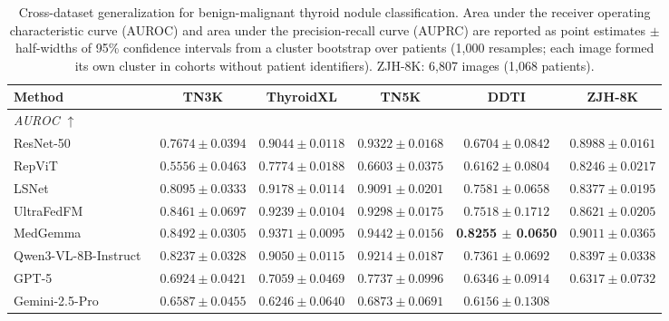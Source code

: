 \begin{table}[p]
\centering
\begin{threeparttable}

\caption{Cross-dataset generalization for benign-malignant thyroid nodule classification. Area under the receiver operating characteristic curve (AUROC) and area under the precision-recall curve (AUPRC) are reported as point estimates $\pm$ half-widths of 95\% confidence intervals from a cluster bootstrap over patients (1{,}000 resamples; each image formed its own cluster in cohorts without patient identifiers). ZJH-8K: 6{,}807 images (1{,}068 patients).}
\label{tab:cls_performance}

\footnotesize
\setlength{\tabcolsep}{5.5pt}
\renewcommand{\arraystretch}{1.08}

\begin{tabular}{lccccc}
\toprule
\textbf{Method}
& \textbf{TN3K}
& \textbf{ThyroidXL}
& \textbf{TN5K}
& \textbf{DDTI}
& \textbf{ZJH-8K} \\
\midrule
\multicolumn{6}{l}{\textit{AUROC $\uparrow$}} \\
\midrule
ResNet-50~\cite{he2016deep}
& $0.7674 \pm 0.0394$
& $0.9044 \pm 0.0118$
& $0.9322 \pm 0.0168$
& $0.6704 \pm 0.0842$
& $0.8988 \pm 0.0161$ \\
RepViT~\cite{wang2023repvit}
& $0.5556 \pm 0.0463$
& $0.7774 \pm 0.0188$
& $0.6603 \pm 0.0375$
& $0.6162 \pm 0.0804$
& $0.8246 \pm 0.0217$ \\
LSNet~\cite{wang2025lsnet}
& $0.8095 \pm 0.0333$
& $0.9178 \pm 0.0114$
& $0.9091 \pm 0.0201$
& $0.7581 \pm 0.0658$
& $0.8377 \pm 0.0195$ \\
UltraFedFM~\cite{jiang2025pretraining}
& $0.8461 \pm 0.0697$
& $0.9239 \pm 0.0104$
& $0.9298 \pm 0.0175$
& $0.7518 \pm 0.1712$
& $0.8621 \pm 0.0205$ \\
MedGemma~\cite{sellergren2025medgemma}
& $0.8492 \pm 0.0305$
& $0.9371 \pm 0.0095$
& $0.9442 \pm 0.0156$
& \textbf{0.8255 $\pm$ 0.0650}
& $0.9011 \pm 0.0365$ \\
Qwen3-VL-8B-Instruct~\cite{bai2025qwen3}
& $0.8237 \pm 0.0328$
& $0.9050 \pm 0.0115$
& $0.9214 \pm 0.0187$
& $0.7361 \pm 0.0692$
& $0.8397 \pm 0.0338$ \\
GPT-5~\cite{openai2025gpt5systemcard}
& $0.6924 \pm 0.0421$
& $0.7059 \pm 0.0469$
& $0.7737 \pm 0.0996$
& $0.6346 \pm 0.0914$
& $0.6317 \pm 0.0732$ \\
Gemini-2.5-Pro~\cite{comanici_gemini_2025}
& $0.6587 \pm 0.0455$
& $0.6246 \pm 0.0640$
& $0.6873 \pm 0.0691$
& $0.6156 \pm 0.1308$

\end{tabular}
\end{threeparttable}
\end{table}
